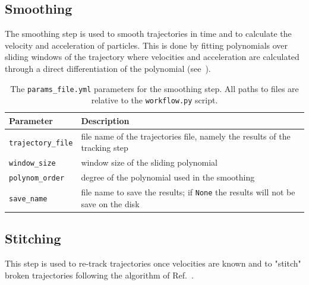 \documentclass[10pt,a4paper]{article}
\begin{document}
\subsection{Smoothing}\label{sec:workflow_smooth}


The smoothing step is used to smooth trajectories in time and to calculate the velocity and acceleration of particles. This is done by fitting polynomials over sliding windows of the trajectory where velocities and acceleration are calculated through a direct differentiation of the polynomial (see~\cite{Luthi2005}).



\begin{table}[!ht]
	\centering
	\caption{The \texttt{params\_file.yml} parameters for the smoothing step. All paths to files are relative to the \texttt{workflow.py} script.}
	\begin{tabular}{l m{10cm}}
		\hline
		Parameter & Description\\
		\hline
		
		\texttt{trajectory\_file} & file name of the trajectories file, namely the results of the tracking step \\[.5em]
		
		\texttt{window\_size} & window size of the sliding polynomial \\[.5em]
		
		\texttt{polynom\_order} & degree of the polynomial used in the smoothing \\[.5em]
		
		\texttt{save\_name} & file name to save the results; if \texttt{None} the results will not be save on the disk \\[.5em]
		
		\hline
	\end{tabular}
\end{table}

    
    


\subsection{Stitching}\label{sec:workflow_stitch}

This step is used to re-track trajectories once velocities are known and to "stitch" broken trajectories following the algorithm of Ref.~\cite{Xu2008}.
\end{document}
